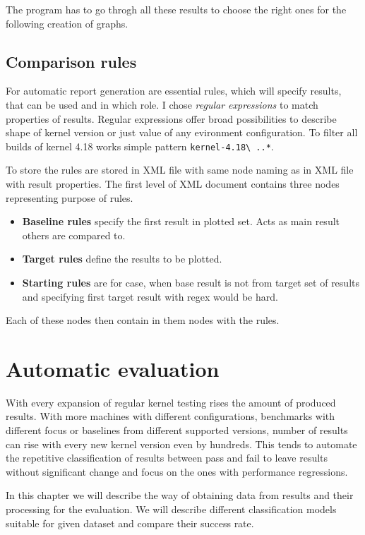 The program has to go throgh all these results to choose the right ones for the
following creation of graphs.

\section{Comparison rules}
For automatic report generation are essential rules, which will specify results,
that can be used and in which role. I chose \emph{regular expressions} to match
properties of results. Regular expressions offer broad possibilities to describe
shape of kernel version or just value of any evironment configuration. To filter
all builds of kernel 4.18 works simple pattern \texttt{kernel-4.18\textbackslash
..*}.

To store the rules are stored in XML file with same node naming as in XML file
with result properties. The first level of XML document contains three nodes
representing purpose of rules.
\begin{itemize}
  \item \textbf{Baseline rules} specify the first result in plotted set. Acts as
    main result others are compared to.
  \item \textbf{Target rules} define the results to be plotted.
  \item \textbf{Starting rules} are for case, when base result is not from
    target set of results and specifying first target result with regex would be
    hard.
\end{itemize}
Each of these nodes then contain in them nodes with the rules.


\chapter{Automatic evaluation}
With every expansion of regular kernel testing rises the amount of produced
results. With more machines with different configurations, benchmarks with
different focus or baselines from different supported versions, number of results
can rise with every new kernel version even by hundreds. This tends to automate
the repetitive classification of results between pass and fail to leave results
without significant change and focus on the ones with performance regressions.

In this chapter we will describe the way of obtaining data from results and
their processing for the evaluation. We will describe different classification
models suitable for given dataset and compare their success rate.

